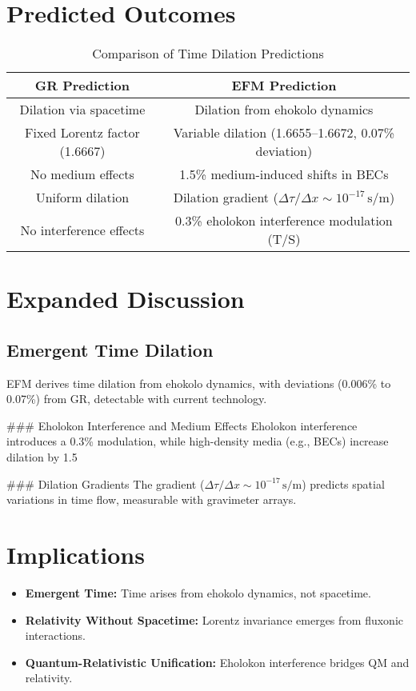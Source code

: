 \documentclass[11pt]{article}
\begin{document}
\section{Predicted Outcomes}
\begin{table}[htbp]
    \centering
    \begin{tabular}{|c|c|}
        \hline
        \textbf{GR Prediction} & \textbf{EFM Prediction} \\
        \hline
        Dilation via spacetime & Dilation from ehokolo dynamics \\
        Fixed Lorentz factor (1.6667) & Variable dilation (1.6655--1.6672, 0.07\% deviation) \\
        No medium effects & 1.5\% medium-induced shifts in BECs \\
        Uniform dilation & Dilation gradient (\(\Delta \tau/\Delta x \sim 10^{-17} \, \text{s/m}\)) \\
        No interference effects & 0.3\% eholokon interference modulation (T/S) \\
        \hline
    \end{tabular}
    \caption{Comparison of Time Dilation Predictions}
    \label{tab:predictions}
\end{table}

\section{Expanded Discussion}
\subsection{Emergent Time Dilation}
EFM derives time dilation from ehokolo dynamics, with deviations (0.006\% to 0.07\%) from GR, detectable with current technology.

### Eholokon Interference and Medium Effects
Eholokon interference introduces a 0.3\% modulation, while high-density media (e.g., BECs) increase dilation by 1.5%

### Dilation Gradients
The gradient (\(\Delta \tau/\Delta x \sim 10^{-17} \, \text{s/m}\)) predicts spatial variations in time flow, measurable with gravimeter arrays.

\section{Implications}
\begin{itemize}
    \item \textbf{Emergent Time:} Time arises from ehokolo dynamics, not spacetime.
    \item \textbf{Relativity Without Spacetime:} Lorentz invariance emerges from fluxonic interactions.
    \item \textbf{Quantum-Relativistic Unification:} Eholokon interference bridges QM and relativity.
\end{itemize}
\end{document}
